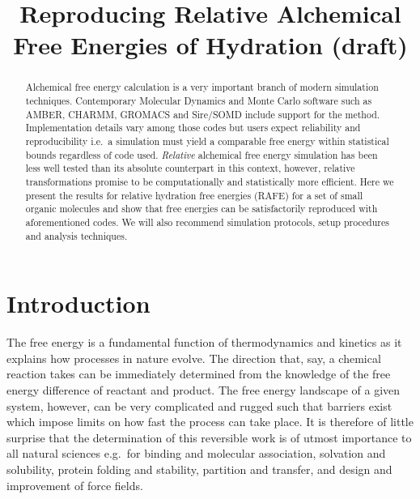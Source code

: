 \documentclass[journal=jctcce,manuscript=article]{achemso}
\title{Reproducing Relative Alchemical Free Energies of Hydration
  (draft)}
\begin{document}
\begin{abstract}
  Alchemical free energy calculation is a very important branch of
  modern simulation techniques.  Contemporary Molecular Dynamics and
  Monte Carlo software such as AMBER, CHARMM, GROMACS and Sire/SOMD
  include support for the method.  Implementation details vary among
  those codes but users expect reliability and reproducibility i.e.\ a
  simulation must yield a comparable free energy within statistical
  bounds regardless of code used.  \emph{Relative} alchemical free
  energy simulation has been less well tested than its absolute
  counterpart in this context, however, relative transformations
  promise to be computationally and statistically more efficient.
  Here we present the results for relative hydration free energies
  (RAFE) for a set of small organic molecules and show that free
  energies can be satisfactorily reproduced with aforementioned codes.
  We will also recommend simulation protocols, setup procedures and
  analysis techniques.
\end{abstract}

\begin{tocentry}
\end{tocentry}





\section{Introduction}
\label{sec:intro}

The free energy is a fundamental function of thermodynamics and
kinetics as it explains how processes in nature evolve.  The direction
that, say, a chemical reaction takes can be immediately determined
from the knowledge of the free energy difference of reactant and
product.  The free energy landscape of a given system, however, can be
very complicated and rugged such that barriers exist which impose
limits on how fast the process can take place.  It is therefore of
little surprise that the determination of this reversible work is of
utmost importance to all natural sciences e.g.\ for binding and
molecular association, solvation and solubility, protein folding and
stability, partition and transfer, and design and improvement of force
fields.
\end{document}
